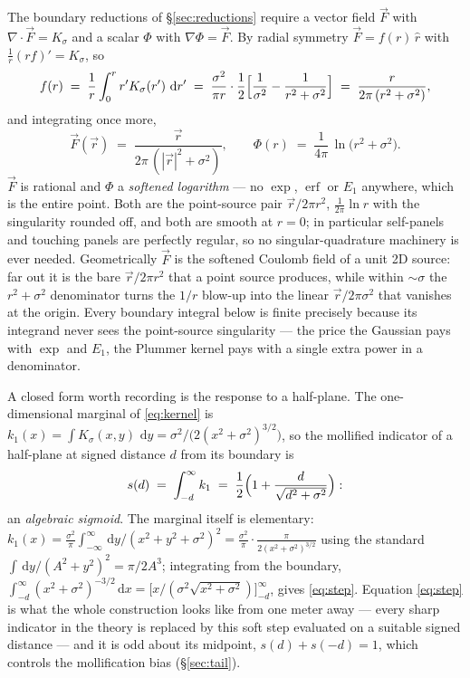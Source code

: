 \documentclass[11pt]{article}
\newcommand{\dd}{\,\mathrm{d}}
\begin{document}
The boundary reductions of \S\ref{sec:reductions} require a vector field $\vec F$
with $\nabla\!\cdot\!\vec F = K_\sigma$ and a scalar $\Phi$ with $\nabla\Phi=\vec F$.
By radial symmetry $\vec F = f(r)\,\hat r$ with $\frac1r (rf)' = K_\sigma$, so
\[
  f(r) \;=\; \frac1r\int_0^r r' K_\sigma(r')\,\dd r'
        \;=\; \frac{\sigma^2}{\pi r}\cdot\frac12\Bigl[\frac1{\sigma^2}
              -\frac1{r^2+\sigma^2}\Bigr]
        \;=\; \frac{r}{2\pi\,(r^2+\sigma^2)} ,
\]
and integrating once more,
\begin{equation}
  \vec F(\vec r) \;=\; \frac{\vec r}{2\pi\,(|\vec r|^2+\sigma^2)},
  \qquad
  \Phi(r) \;=\; \frac{1}{4\pi}\,\ln\!\bigl(r^2+\sigma^2\bigr).
  \label{eq:FPhi}
\end{equation}
$\vec F$ is rational and $\Phi$ a \emph{softened logarithm} --- no $\exp$, $\operatorname{erf}$
or $E_1$ anywhere, which is the entire point.  Both are the point-source pair
$\vec r/2\pi r^2$, $\tfrac1{2\pi}\ln r$ with the singularity rounded off, and both are
smooth at $r=0$; in particular self-panels and touching panels are perfectly regular,
so no singular-quadrature machinery is ever needed.  Geometrically $\vec F$ is the
softened Coulomb field of a unit 2D source: far out it is the bare $\vec r/2\pi r^2$
that a point source produces, while within $\sim\sigma$ the $r^2+\sigma^2$ denominator
turns the $1/r$ blow-up into the linear $\vec r/2\pi\sigma^2$ that vanishes at the
origin.  Every boundary integral below is finite precisely because its integrand never
sees the point-source singularity --- the price the Gaussian pays with $\exp$ and $E_1$,
the Plummer kernel pays with a single extra power in a denominator.

A closed form worth recording is the response to a half-plane.  The one-dimensional
marginal of \eqref{eq:kernel} is
$k_1(x)=\int K_\sigma(x,y)\,\dd y = \sigma^2/\bigl(2(x^2+\sigma^2)^{3/2}\bigr)$, so
the mollified indicator of a half-plane at signed distance $d$ from its boundary is
\begin{equation}
  s(d) \;=\; \int_{-d}^{\infty} k_1
       \;=\; \frac12\Bigl(1+\frac{d}{\sqrt{d^2+\sigma^2}}\Bigr):
  \label{eq:step}
\end{equation}
an \emph{algebraic sigmoid}.  The marginal itself is elementary:
$k_1(x)=\tfrac{\sigma^2}{\pi}\int_{-\infty}^{\infty}\dd y/(x^2+y^2+\sigma^2)^2
=\tfrac{\sigma^2}{\pi}\cdot\tfrac{\pi}{2(x^2+\sigma^2)^{3/2}}$ using the standard
$\int\dd y/(A^2+y^2)^2=\pi/2A^3$; integrating from the boundary,
$\int_{-d}^{\infty}(x^2+\sigma^2)^{-3/2}\dd x=\bigl[x/(\sigma^2\sqrt{x^2+\sigma^2})\bigr]_{-d}^{\infty}$,
gives \eqref{eq:step}.  Equation \eqref{eq:step} is what the whole construction
looks like from one meter away --- every sharp indicator in the theory is replaced by
this soft step evaluated on a suitable signed distance --- and it is odd about its
midpoint, $s(d)+s(-d)=1$, which controls the mollification bias
(\S\ref{sec:tail}).
\end{document}
